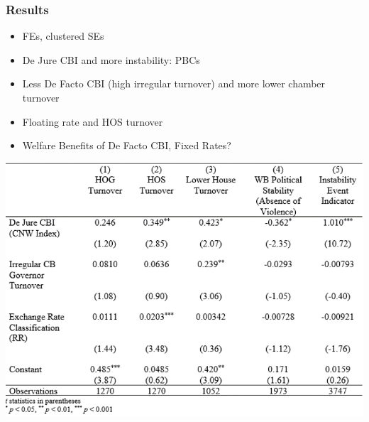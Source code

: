 \documentclass[]{beamer}
\begin{document}
\begin{frame}
\frametitle{Results}
\begin{itemize}
\item FEs, clustered SEs
\item De Jure CBI and more instability: PBCs
\item Less De Facto CBI (high irregular turnover) and more lower chamber turnover
\item Floating rate and HOS turnover
\item Welfare Benefits of De Facto CBI, Fixed Rates?
\end{itemize}
\includegraphics{img0002.png}
\end{frame}
\end{document}
